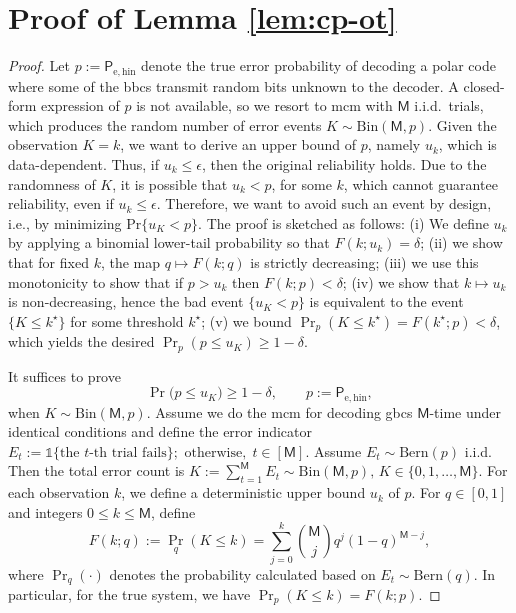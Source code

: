 \documentclass[onecolumn]{IEEEtran} %
\newcommand{\1}{\mathbbm{1}}
\theoremstyle{boldremark}
\begin{document}
\section{Proof of Lemma \ref{lem:cp-ot}}\label{APP_proof_lem:cp-ot}
\begin{proof}
Let $p:=\textsf{P}_{\mathrm{e,hin}}$ denote the true error probability of decoding a polar code where some of the \gls{bbcs} transmit random bits unknown to the decoder. A closed-form expression of $p$ is not available, so we resort to \gls{mcm} with $\textsf{M}$ i.i.d.\ trials, which produces the random number of error events
$K\sim\mathrm{Bin}(\textsf{M},p)$. Given the observation $K=k$, we want to derive an upper bound of $p$, namely $u_k$, which is data-dependent. Thus, if $u_k\leq \epsilon$, then the original reliability holds. Due to the randomness of $K$, it is possible that $u_k<p$, for some $k$, which cannot guarantee reliability, even if $u_k\leq \epsilon.$ Therefore, we want to avoid such an event by design, i.e., by minimizing Pr$\{u_K<p\}$. The proof is sketched as follows:
(i) We define $u_k$ by applying a binomial lower-tail probability so that $F(k;u_k)=\delta$;
(ii) we show that for fixed $k$, the map $q\mapsto F(k;q)$ is strictly decreasing;
(iii) we use this monotonicity to show that if $p>u_k$ then $F(k;p)<\delta$;
(iv) we show that $k\mapsto u_k$ is non-decreasing, hence the bad event $\{u_K<p\}$ is equivalent to the
event $\{K\le k^\star\}$ for some threshold $k^\star$;
(v) we bound $\Pr_p(K\le k^\star)=F(k^\star;p)<\delta$, which yields the desired $\Pr_p(p\le u_K)\ge 1-\delta$.



It suffices to prove 
\begin{equation}\label{eq:goal_pk_clean}
\Pr\bigl(p\le u_K\bigr)\ge 1-\delta,
\qquad p:=\textsf{P}_{\mathrm{e,hin}},
\end{equation}
when $K\sim\mathrm{Bin}(\textsf{M},p).$ Assume we do the \gls{mcm} for decoding \gls{gbcs} $\textsf{M}$-time under identical conditions and define the error indicator $E_t :=  \mathds{1}\{\mbox{the $t$-th trial fails}\};\text{ otherwise}, \; t\in[\textsf{M}].$
Assume $E_t\sim\mathrm{Bern}(p)$ i.i.d. Then the total error count is $
K:=\sum_{t=1}^{\textsf{M}} E_t \sim \mathrm{Bin}(\textsf{M},p),
\, K\in\{0,1,\dots,\textsf{M}\}.$ For each observation $k$, we define a deterministic upper bound $u_k$ of $p$. For $q\in[0,1]$ and integers $0\le k\le \textsf{M}$, define
\begin{equation}\label{eq:def_Fkq_again}
F(k;q)
:=\Pr_q(K\le k)
=\sum_{j=0}^k \binom{\textsf{M}}{j} q^j(1-q)^{\textsf{M}-j},
\end{equation}
where $\Pr_q(\cdot)$ denotes the probability calculated based on $E_t\sim\mathrm{Bern}(q)$.
In particular, for the true system, we have $\Pr_p(K\le k)=F(k;p)$.


\end{proof}
\end{document}
